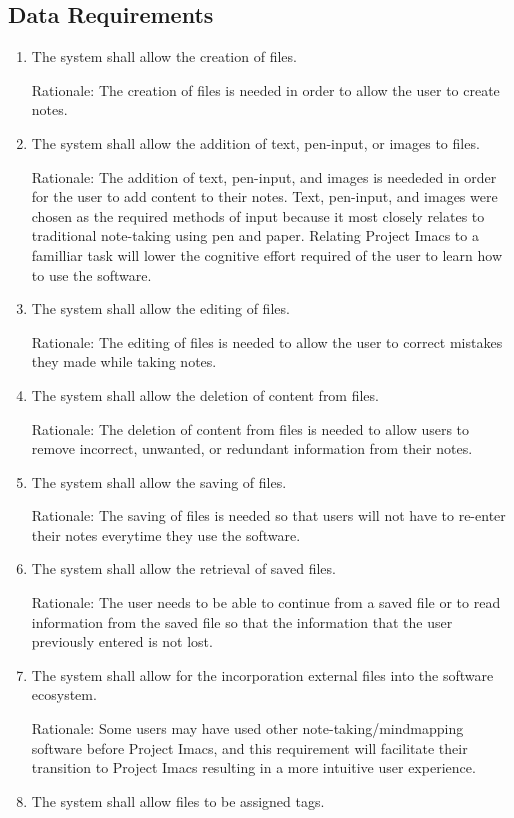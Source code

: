 \documentclass{article}
\begin{document}
\subsection{Data Requirements}
\begin{enumerate}[DR1]
    \item The system shall allow the creation of files.

	Rationale: The creation of files is needed in order to allow the user to create notes.
	\item The system shall allow the addition of text, pen-input, or images to files.

	Rationale: The addition of text, pen-input, and images is neededed in order for the user to add content to their notes. Text, pen-input, and images were chosen as the required methods of input because it most closely relates to traditional note-taking using pen and paper. Relating Project Imacs to a familliar task will lower the cognitive effort required of the user to learn how to use the software.
    \item The system shall allow the editing of files.

	Rationale: The editing of files is needed to allow the user to correct mistakes they made while taking notes.

	\item The system shall allow the deletion of content from files.

	Rationale: The deletion of content from files is needed to allow users to remove incorrect, unwanted, or redundant information from their notes.
    \item The system shall allow the saving of files.

	Rationale: The saving of files is needed so that users will not have to re-enter their notes everytime they use the software.
    \item The system shall allow the retrieval of saved files.

	Rationale: The user needs to be able to continue from a saved file or to read information from the saved file so that the information that the user previously entered is not lost.
    \item The system shall allow for the incorporation external files into the software ecosystem.

	Rationale: Some users may have used other note-taking/mindmapping software before Project Imacs, and this requirement will facilitate their transition to Project Imacs resulting in a more intuitive user experience.
    \item The system shall allow files to be assigned tags.


\end{enumerate}
\end{document}
